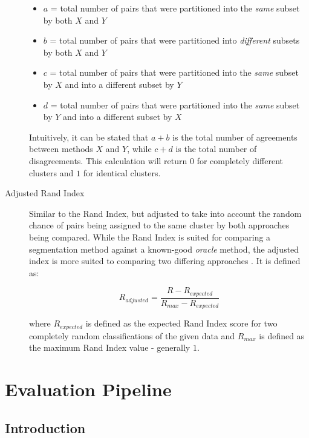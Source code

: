 \documentclass{uvamscse}	%
\begin{document}
\begin{description}
	\begin{itemize}
		\item $a$ = total number of pairs that were partitioned into the \emph{same} subset by both $X$ and $Y$
		\item $b$ = total number of pairs that were partitioned into \emph{different} subsets by both $X$ and $Y$
		\item $c$ = total number of pairs that were partitioned into the \emph{same} subset by $X$ and into a different subset by $Y$
		\item $d$ = total number of pairs that were partitioned into the \emph{same} subset by $Y$ and into a different subset by $X$
	\end{itemize}
	
	Intuitively, it can be stated that $a+b$ is the total number of agreements between methods $X$ and $Y$, while $c+d$ is the total number of disagreements. This calculation will return $0$ for completely different clusters and $1$ for identical clusters.
	
	\item[Adjusted Rand Index]Similar to the Rand Index, but adjusted to take into account the random chance of pairs being assigned to the same cluster by both approaches being compared. While the Rand Index is suited for comparing a segmentation method against a known-good \emph{oracle} method, the adjusted index is more suited to comparing two differing approaches \cite{Matteson2012}. It is defined as:
	
	\begin{equation}
	    R_{adjusted} = \frac{R - R_{expected}}{R_{max} - R_{expected}}
	\end{equation}
	
	where $R_{expected}$ is defined as the expected Rand Index score for two completely random classifications of the given data and $R_{max}$ is defined as the maximum Rand Index value - generally $1$.

\end{description}

\section{Evaluation Pipeline}

\subsection{Introduction}
\end{document}
